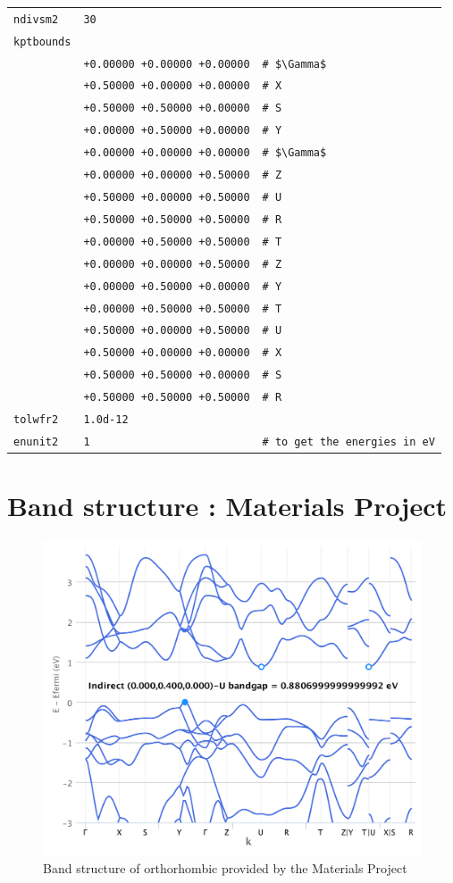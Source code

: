 \documentclass[11pt,a4paper]{article}
\begin{document}
\begin{center}
\begin{tabular}{lll}
\texttt{ndivsm2}&\texttt{30}&\\
\texttt{kptbounds}&&\\
&\texttt{+0.00000 +0.00000 +0.00000}&\texttt{\# \$\textbackslash Gamma\$}\\
&\texttt{+0.50000  +0.00000  +0.00000}&\texttt{\# X}\\
&\texttt{+0.50000  +0.50000  +0.00000}&\texttt{\# S}\\
&\texttt{+0.00000  +0.50000  +0.00000}&\texttt{\# Y}\\
&\texttt{+0.00000  +0.00000  +0.00000}&\texttt{\# \$\textbackslash Gamma\$}\\
&\texttt{+0.00000  +0.00000  +0.50000}&\texttt{\# Z}\\
&\texttt{+0.50000  +0.00000  +0.50000}&\texttt{\# U}\\
&\texttt{+0.50000  +0.50000  +0.50000}&\texttt{\# R}\\
&\texttt{+0.00000  +0.50000  +0.50000}&\texttt{\# T}\\
&\texttt{+0.00000  +0.00000  +0.50000}&\texttt{\# Z}\\
&\texttt{+0.00000  +0.50000  +0.00000}&\texttt{\# Y}\\
&\texttt{+0.00000  +0.50000  +0.50000}&\texttt{\# T}\\
&\texttt{+0.50000  +0.00000  +0.50000}&\texttt{\# U}\\
&\texttt{+0.50000  +0.00000  +0.00000}&\texttt{\# X}\\
&\texttt{+0.50000  +0.50000  +0.00000}&\texttt{\# S}\\
&\texttt{+0.50000  +0.50000  +0.50000}&\texttt{\# R}\\
\texttt{tolwfr2}&\texttt{1.0d-12}&\\
\texttt{enunit2}&\texttt{1}&\texttt{\# to get the energies in eV}\\
\end{tabular}
\end{center}
\newpage
\section{Band structure : Materials Project}
\label{Abi7}
\begin{figure}[h]
\centering
\includegraphics[width=\textwidth]{images/chart.pdf}
\caption{Band structure of orthorhombic  provided by the Materials Project}
\end{figure}
\end{document}

